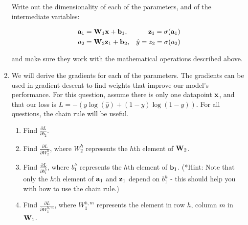 \documentclass[submit]{harvardml}
\begin{document}
\begin{problem}
\begin{enumerate}
      Write out the dimensionality of each of the parameters, and of the intermediate variables:

          \begin{align*}
          \bold{a}_1 &= \bold{W}_1 \bold{x} + \bold{b}_1, 
          &\bold{z}_1 = \sigma(\bold{a}_1) \\
          a_2 &= \bold{W}_2 \bold{z}_1 + \bold{b}_2, 
          &\hat{y} = z_2 = \sigma(a_2)
          \end{align*}
          
      and make sure they work with the mathematical operations described above.
      
    \item  We will derive the gradients for each of the parameters.  The gradients can be used in gradient descent to find weights that improve our model's performance. For this question, assume there is only one datapoint $\bold{x}$, and that our loss is $L = -(y \log (\hat{y}) + (1 - y) \log (1 - \hat{y}))$. For all questions, the chain rule will be useful.
    \begin{enumerate}
        \item Find $\frac{\partial L}{\partial b_2}$. 
        
        \item Find $\frac{\partial L}{\partial W_2^h}$, where $W_2^h$ represents the $h$th element of $\bold{W}_2$.
        
        \item Find $\frac{\partial L}{\partial b_1^h}$, where $b_1^h$ represents the $h$th element of $\bold{b}_1$. (*Hint: Note that only the $h$th element of $\bold{a}_1$ and $\bold{z}_1$ depend on $b_1^h$ - this should help you with how to use the chain rule.)
        
        \item Find $\frac{\partial L}{\partial W_1^{h,m}}$, where  $W_1^{h,m}$ represents the element in row $h$, column $m$ in $\bold{W}_1$.
    
    \end{enumerate}
    \end{enumerate}
    
    \end{problem}
\newpage
\end{document}
